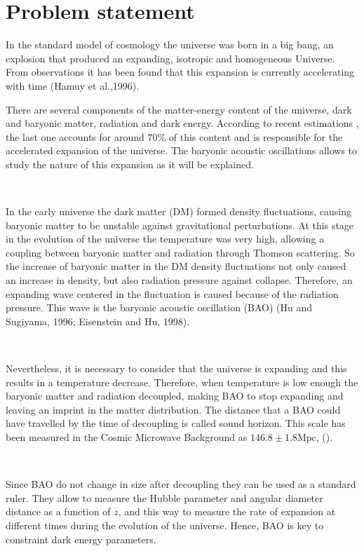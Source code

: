 \documentclass[a4,useAMS,usegraphicx,12pt]{article}
\begin{document}
\newpage


\section{Problem statement }

In the standard model of cosmology the universe was born in a big bang, an explosion that produced an
expanding, isotropic and homogeneous Universe. From observations it has been found that this expansion  
is currently accelerating with time (Hamuy et al.,1996). 

There are several components of the matter-energy content of the universe, 
dark and baryonic matter, radiation and dark energy. According to recent estimations \citep{DEF}, the last one accounts for 
around $70\%$ of this content and is responsible for the accelerated expansion of the universe. 
The baryonic acoustic oscillations allows to study the nature of this expansion as it will be explained.

\

In the early universe the dark matter (DM) formed density fluctuations, causing baryonic matter to be unstable against
gravitational perturbations. At this stage in the evolution of the universe the temperature was very high, allowing a coupling between
baryonic matter and radiation through Thomson scattering. 
So the increase of baryonic matter in the DM density fluctuations not only caused an increase 
in density, but also radiation pressure against collapse. Therefore, an expanding wave centered in the fluctuation
is caused because of the radiation pressure. This wave is the baryonic acoustic oscillation (BAO) (Hu and Sugiyama, 1996;
Eisenstein and Hu, 1998). 

\	

Nevertheless, it is necessary to consider that the universe is expanding and this results in a  
temperature decrease. Therefore, when temperature is low enough the baryonic matter and radiation 
decoupled, making BAO to stop expanding and leaving an imprint in the matter distribution. 
The distance that a BAO could have travelled by the time of
decoupling is called sound horizon. This scale has been measured in the Cosmic Microwave Background 
as $146.8\pm 1.8 \mathrm{Mpc}$, (\cite{SIZE}).  

\

Since BAO do not change in size after decoupling they can be used as a standard ruler.  They allow to
measure the Hubble parameter and angular diameter distance as a function of $z$, and this way to measure the rate 
of expansion at different times during the evolution of the universe. Hence, BAO is key to constraint dark energy 
parameters. 
\end{document}
